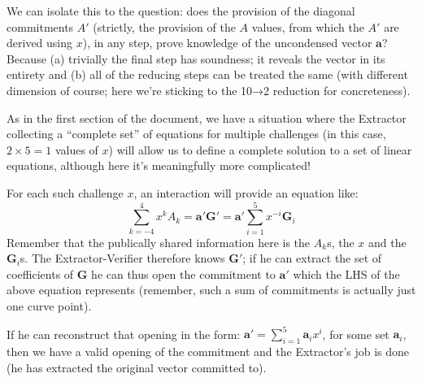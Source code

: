 \documentclass[10pt,a4paper]{article}
\begin{document}
We can isolate this to the question: does the provision of the diagonal
commitments $A'$ (strictly, the provision of the $A$ values, from which the $A'$ are
derived using $x$), in any step, prove knowledge of the uncondensed vector
$\mathbf{a}$? Because (a) trivially the final step has soundness; it reveals the
vector in its entirety and (b) all of the reducing steps can be treated
the same (with different dimension of course; here we're sticking to the
10→2 reduction for concreteness).

As in the first section of the document, we have a situation where the
Extractor collecting a ``complete set'' of equations for multiple
challenges (in this case, $2\times 5 =1$ values of $x$) will allow us to define a complete
solution to a set of linear equations, although here it's meaningfully
more complicated!

For each such challenge $x$, an interaction will provide an equation like:
\[\sum\limits_{k=-4}^{4} x^k A_k = \textbf{a}' \textbf{G}' = \textbf{a}' \sum\limits_{i=1}^{5} x^{-i} \textbf{G}_i\]
Remember that the publically shared information here is the $A_k$s, the $x$ and
the $\mathbf{G}_i$s. The Extractor-Verifier therefore knows $\mathbf{G}'$; if he can extract the
set of coefficients of $\mathbf{G}$ he can thus open the commitment to $\mathbf{a}'$ which the LHS
of the above equation represents (remember, such a sum of commitments is
actually just one curve point).

If he can reconstruct that opening in the form: $\textbf{a}' = \sum_{i=1}^5 \textbf{a}_i x^i$, for some set $\mathbf{a}_i$, then we
have a valid opening of the commitment and the Extractor's job is done
(he has extracted the original vector committed to).
\end{document}
